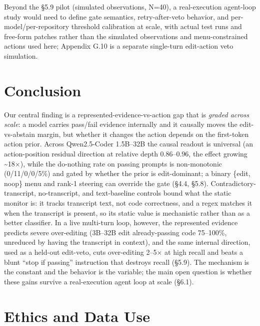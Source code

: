 \documentclass[
  11pt,
  a4paper]{article}
\begin{document}
Beyond the \S{}5.9 pilot (simulated observations, N=40), a real-execution
agent-loop study would need to define gate semantics, retry-after-veto
behavior, and per-model/per-repository threshold calibration at scale,
with actual test runs and free-form patches rather than the simulated
observations and menu-constrained actions used here; Appendix G.10 is a
separate single-turn edit-action veto simulation.

\section{Conclusion}\label{conclusion}

Our central finding is a represented-evidence-vs-action gap that is
\emph{graded across scale}: a model carries pass/fail evidence
internally and it causally moves the edit-vs-abstain margin, but whether
it changes the action depends on the first-token action prior. Across
Qwen2.5-Coder 1.5B--32B the causal readout is universal (an
action-position residual direction at relative depth 0.86--0.96, the
effect growing \textasciitilde18\ensuremath{\times}), while the do-nothing rate on passing
prompts is non-monotonic (0/11/0/0/5\%) and gated by whether the prior
is edit-dominant; a binary \{edit, noop\} menu and rank-1 steering can
override the gate (\S{}4.4, \S{}5.8). Contradictory-transcript, no-transcript,
and text-baseline controls bound what the static monitor is: it tracks
transcript text, not code correctness, and a regex matches it when the
transcript is present, so its static value is mechanistic rather than as
a better classifier. In a live multi-turn loop, however, the represented
evidence predicts severe over-editing (3B--32B edit already-passing code
75--100\%, unreduced by having the transcript in context), and the same
internal direction, used as a held-out edit-veto, cuts over-editing
2--5\ensuremath{\times} at high recall and beats a blunt ``stop if passing'' instruction
that destroys recall (\S{}5.9). The mechanism is the constant and the
behavior is the variable; the main open question is whether these gains
survive a real-execution agent loop at scale (\S{}6.1).

\section{Ethics and Data Use}\label{ethics-and-data-use}
\end{document}
